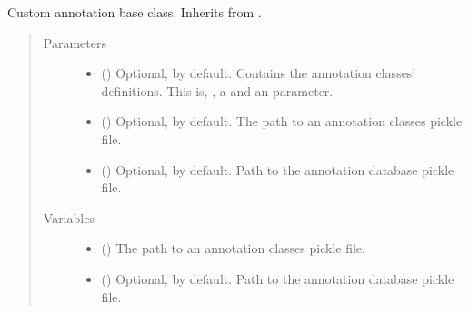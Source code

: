 \documentclass[letterpaper,10pt,english]{sphinxmanual}
\begin{document}

\begin{fulllineitems}
\label{\detokenize{reference:pypath.annot.CustomAnnotation}}
Custom annotation base class. Inherits from
.
\begin{quote}\begin{description}
\item[{Parameters}] \leavevmode\begin{itemize}
\item {} 
 () \textendash{} Optional,  by default. Contains the annotation classes’
definitions. This is, , a  and an
 parameter.

\item {} 
 () \textendash{} Optional,  by default. The path to an annotation classes
pickle file.

\item {} 
 () \textendash{} Optional,  by default. Path to the annotation database
pickle file.

\end{itemize}

\item[{Variables}] \leavevmode\begin{itemize}
\item {} 
 () \textendash{} The path to an annotation classes pickle file.

\item {} 
 () \textendash{} Optional,  by default. Path to the annotation database
pickle file.


\end{itemize}
\end{description}
\end{quote}
\end{fulllineitems}
\end{document}
